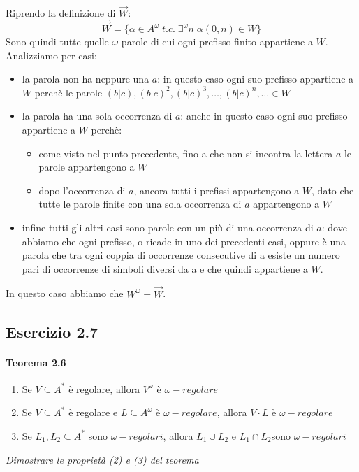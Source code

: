 \documentclass[12pt]{article}
\begin{document}
Riprendo la definizione di $\overrightarrow{W}$: 
$$\overrightarrow{W}=\{\alpha\in A^\omega \; t.c.\; \exists^\omega n \; \alpha(0,n) \in W\}$$
Sono quindi tutte quelle $\omega$-parole di cui ogni prefisso finito appartiene a $W$.
Analizziamo per casi:
\begin{itemize}
	\item la parola non ha neppure una $a$: in questo caso ogni suo prefisso appartiene a $W$ perchè le parole $(b|c),(b|c)^2,(b|c)^3,\ldots,(b|c)^n,\ldots \in W$
	\item la parola ha una sola occorrenza di $a$: anche in questo caso ogni suo prefisso appartiene a $W$ perchè:
	\begin{itemize}
		\item come visto nel punto precedente, fino a che non si incontra la lettera $a$ le parole appartengono a $W$
		\item dopo l'occorrenza di $a$, ancora tutti i prefissi appartengono a $W$, dato che tutte le parole finite con una sola occorrenza di $a$ appartengono a $W$
	\end{itemize}	
	\item infine tutti gli altri casi sono parole con un più di una occorrenza di $a$: dove abbiamo che ogni prefisso, o ricade in uno dei precedenti casi, oppure è una parola che tra ogni
coppia di occorrenze consecutive di a esiste un numero pari di occorrenze di simboli diversi da a e che quindi appartiene a $W$.
\end{itemize}

In questo caso abbiamo che $W^\omega = \overrightarrow{W}$.


\subsection*{Esercizio 2.7}
\paragraph*{Teorema 2.6}
\begin{enumerate}
	\item Se $V \subseteq A^*$ è regolare, allora $V^\omega$ è $\omega -regolare$
	\item Se $V \subseteq A^*$ è regolare e $L \subseteq A^\omega$ è $\omega -regolare$, allora $V\cdot L$ è $\omega -regolare$
	\item Se $L_1, L_2\subseteq A^*$ sono $\omega -regolari$, allora $L_1 \cup L_2$ e $L_1 \cap L_2$sono $\omega -regolari$
\end{enumerate}
\textit{Dimostrare le proprietà (2) e (3) del teorema}
\end{document}
